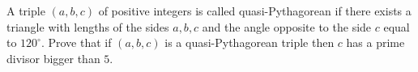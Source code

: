 A triple $(a,b,c)$ of positive integers is called quasi-Pythagorean if there exists a triangle with lengths of the sides $a,b,c$ and the angle opposite to the side $c$ equal to $120^{\circ}$. Prove that if $(a,b,c)$ is a quasi-Pythagorean triple then $c$ has a prime divisor bigger than $5$.